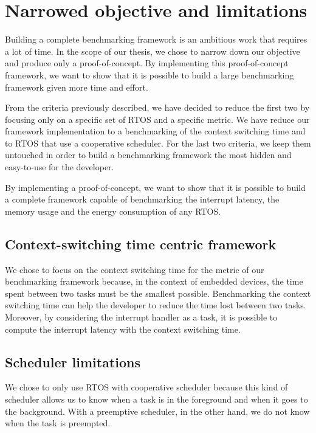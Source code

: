 \section{Narrowed objective and limitations}

Building a complete benchmarking framework is an ambitious work that requires a lot of time.
In the scope of our thesis, we chose to narrow down our objective and produce only a proof-of-concept.
By implementing this proof-of-concept framework, we want to show that it is possible to build a large benchmarking framework given more time and effort.

From the criteria previously described, we have decided to reduce the first two by focusing only on a specific set of RTOS and a specific metric.
We have reduce our framework implementation to a benchmarking of the context switching time and to RTOS that use a cooperative scheduler.
For the last two criteria, we keep them untouched in order to build a benchmarking framework the most hidden and easy-to-use for the developer.

By implementing a proof-of-concept, we want to show that it is possible to build a complete framework capable of benchmarking the interrupt latency, the memory usage and the energy consumption of any RTOS.

\subsection{Context-switching time centric framework}

We chose to focus on the context switching time for the metric of our benchmarking framework because, in the context of embedded devices, the time spent between two tasks must be the smallest possible.
Benchmarking the context switching time can help the developer to reduce the time lost between two tasks.
Moreover, by considering the interrupt handler as a task, it is possible to compute the interrupt latency with the context switching time.

\subsection{Scheduler limitations}

We chose to only use RTOS with cooperative scheduler because this kind of scheduler allows us to know when a task is in the foreground and when it goes to the background.
With a preemptive scheduler, in the other hand, we do not know when the task is preempted.

